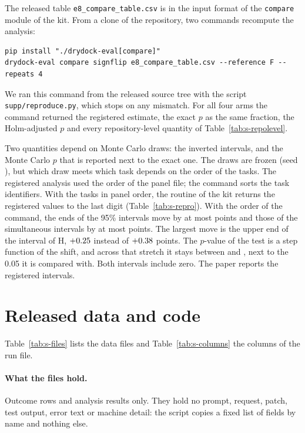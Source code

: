 The released table \texttt{e8\_compare\_table.csv} is in the input format of the \texttt{compare} module of the kit.
From a clone of the repository, two commands recompute the analysis:

\begin{verbatim}
pip install "./drydock-eval[compare]"
drydock-eval compare signflip e8_compare_table.csv --reference F --repeats 4
\end{verbatim}

We ran this command from the released source tree with the script \texttt{supp/reproduce.py}, which stops on any
mismatch. For all four arms the command returned the registered estimate, the exact $p$ as the same fraction, the
Holm-adjusted $p$ and every repository-level quantity of Table~\ref{tab:s-repolevel}.

Two quantities depend on Monte Carlo draws: the inverted intervals, and the Monte Carlo $p$ that is reported next to
the exact one. The draws are frozen (seed \SReproSeed), but which draw meets which task depends on the order of the
tasks. The registered analysis used the order of the panel file; the command sorts the task identifiers. With the
tasks in panel order, the routine of the kit returns the registered values to the last digit
(Table~\ref{tab:s-repro}). With the order of the command, the ends of the 95\% intervals move by at most
\SReproMoveNinetyFive{} points and those of the simultaneous intervals by at most \SReproMoveSim{} points. The largest
move is the upper end of the interval of H, $+0.25$ instead of $+0.38$ points. The $p$-value of the
test is a step function of the shift, and across that stretch it stays between \SReproStepLo{} and \SReproStepHi{},
next to the 0.05 it is compared with. Both intervals include zero. The paper reports the registered intervals.



\section{Released data and code}\label{sec:s-data}

Table~\ref{tab:s-files} lists the data files and Table~\ref{tab:s-columns} the columns of the run file.

\paragraph{What the files hold.}
Outcome rows and analysis results only. They hold no prompt, request, patch, test output, error text or machine
detail: the script copies a fixed list of fields by name and nothing else.

